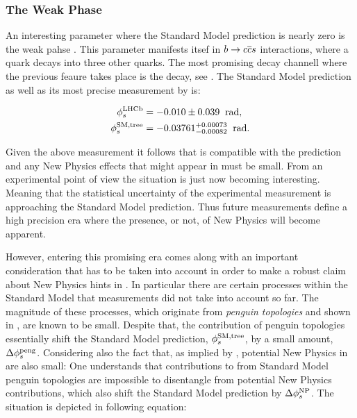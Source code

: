 \subsubsection{The Weak Phase \phis}

An interesting parameter where the Standard Model prediction is nearly zero is the weak pahse \phis.
This parameter manifests itsef in $b\rightarrow c\overline {c}s$ interactions, where a \bquark
quark decays into three other quarks. The most promising decay channell where the previous feaure
takes place is the \BsJpsiPhi decay, see . The Standard Model \phis
prediction as well as its most precise measurement by \lhcb is:

\begin{subequations}
  \label{app_phis_lhcb_theo}
  \begin{align}
  \centering
  \phiS{\lhcb}           &=  -0.010 \pm 0.039  \;\; \text{rad},
  \label{app_phis_lhcb}\\
  \phiS{SM,tree}  &= -0.03761 {}^{+0.00073}_{-0.00082}  \;\; \text{rad}.
  \label{app_phis_theo}
\end{align}
\end{subequations}

\noindent Given the above measurement it follows that \phis is compatible
with the prediction and any New Physics effects that might appear in \phis must be small.
From an experimental point of view the situation is just now becoming interesting.
Meaning that the statistical uncertainty of the experimental measurement is approaching
the Standard Model prediction. Thus future \phis measurements define a high precision
era where the presence, or not, of New Physics will become apparent.

However, entering this promising era comes along with an important consideration
that has to be taken into account in order to make a robust claim about New Physics hints in \phis.
In particular there are certain processes within the Standard Model that \phis measurements
did not take into account so far. The magnitude of these processes, which originate from {\it penguin topologies}
and shown in , are known to be small. Despite that, the
contribution of penguin topologies essentially shift the Standard Model prediction,
$\phi_{s}^{\tiny \text{SM,tree}}$, by a small amount, $\Delta\phi_{s}^{\tiny\text{peng}}$. Considering
also the fact that, as implied by , potential New Physics
in \phis are also small: One understands that contributions to \phis from Standard Model penguin
topologies are impossible to disentangle from potential New Physics contributions, which also
shift the Standard Model prediction by $\Delta\phi_{s}^{\tiny \text{NP}}$.
The situation is depicted in following equation:

